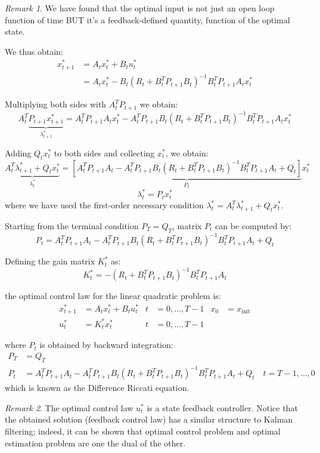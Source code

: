 \documentclass[openany]{book}
\theoremstyle{definition}
\theoremstyle{remark}
\newtheorem*{remark}{Remark}
\begin{document}
\begin{remark}
We have found that the optimal input is not just an open loop function of time BUT it's a feedback-defined quantity, function of the optimal state.
\end{remark}

We thus obtain:
\begin{align*}
    x_{t+1}^* &= A_tx_t^* + B_tu_t^* \\
    &= A_tx_t^* - B_t(R_t + B_t^TP_{t+1}B_t)^{-1}B_t^TP_{t+1}A_tx_t^*
\end{align*}

Multiplying both sides with $A_t^TP_{t+1}$ we obtain:
\[
    A_t^T\underbrace{P_{t+1}x_{t+1}^*}_{\lambda_{t+1}^*} = A_t^TP_{t+1}A_tx_t^* - A_t^TP_{t+1}B_t(R_t + B_t^TP_{t+1}B_t)^{-1}B_t^TP_{t+1}A_tx_t^*
\]

Adding $Q_tx_t^*$ to both sides and collecting $x_t^*$, we obtain:
\[
    \underbrace{A_t^T\lambda_{t+1}^* + Q_tx_t^*}_{\lambda_t^*} = \underbrace{\left[A_t^TP_{t+1}A_t - A_t^TP_{t+1}B_t(R_t + B_t^TP_{t+1}B_t)^{-1}B_t^TP_{t+1}A_t + Q_t\right]}_{P_t}x_t^*
\]
\[
    \lambda_t^* = P_tx_t^*
\]
where we have used the first-order necessary condition $\lambda_t^* = A_t^T\lambda_{t+1}^* + Q_tx_t^*$.

Starting from the terminal condition $P_T = Q_T$, matrix $P_t$ can be computed by:
\[
    P_t = A_t^TP_{t+1}A_t - A_t^TP_{t+1}B_t(R_t + B_t^TP_{t+1}B_t)^{-1}B_t^TP_{t+1}A_t + Q_t
\]

Defining the gain matrix $K_t^*$ as:
\[
    K_t^* = -(R_t + B_t^TP_{t+1}B_t)^{-1}B_t^TP_{t+1}A_t
\]

the optimal control law for the linear quadratic problem is:
\begin{align*}
    x_{t+1}^* &= A_tx_t^* + B_tu_t^* & t &= 0,\ldots,T-1 & x_0 &= x_{\text{init}} \\
    u_t^* &= K_t^*x_t^* & t &= 0,\ldots,T-1
\end{align*}

where $P_t$ is obtained by backward integration:
\begin{align*}
    P_T &= Q_T \\
    P_t &= A_t^TP_{t+1}A_t - A_t^TP_{t+1}B_t(R_t + B_t^TP_{t+1}B_t)^{-1}B_t^TP_{t+1}A_t + Q_t \quad t = T-1,\ldots,0
\end{align*}
which is known as the Difference Riccati equation.

\begin{remark}
The optimal control law $u_t^*$ is a state feedback controller. Notice that the obtained solution (feedback control law) has a similar structure to Kalman filtering; indeed, it can be shown that optimal control problem and optimal estimation problem are one the dual of the other.
\end{remark}
\end{document}

